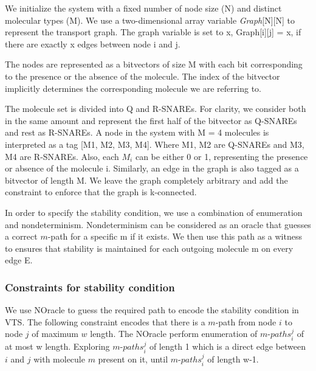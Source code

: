 We initialize the system with a fixed number of node size (N) and distinct molecular types (M). 
%
We use a two-dimensional array variable \textit{Graph}[N][N] to represent the transport graph. The graph variable is set to x, Graph[i][j] = x, if there are exactly x edges between node i and j. 

%
The nodes are represented as a bitvectors of size M with each bit corresponding to the presence or the absence of the molecule. 
%
The index of the bitvector implicitly determines the corresponding molecule we are referring to.
% 

The molecule set is divided into Q and R-SNAREs. 
%
For clarity, we consider both in the same amount and represent the first half of the bitvector as  Q-SNAREs and rest as R-SNAREs.
%
A node in the system with M = 4 molecules is interpreted as a tag [M1, M2, M3, M4]. 
%
Where M1, M2 are Q-SNAREs and M3, M4 are R-SNAREs.
%
Also, each $M_i$ can be either 0 or 1, representing the presence or absence of the molecule i.
%
Similarly, an edge in the graph is also tagged as a bitvector of length M.   
%
We leave the graph completely arbitrary and add the constraint to enforce that the graph is k-connected. 

In order to specify the stability condition, we use a combination of enumeration and nondeterminism.
%
Nondeterminism can be considered as an oracle that guesses a correct $m$-path for a specific m if it exists. 
%
We then use this path as a witness to ensures that stability is maintained for each outgoing molecule m on every edge E.


\subsubsection{Constraints for stability condition}
%
We use NOracle to guess the required path to encode the stability condition in VTS.
%
The following constraint encodes that there is a $m$-path from node $i$ to node $j$ of maximum $w$ length.
%
%
The NOracle perform enumeration of $m$-${paths}_i^j$ of at most w length. 
%
Exploring $m$-${paths}_i^j$ of length 1 which is a direct edge between $i$ and $j$ with molecule $m$ present on it, until $m$-${paths}_i^j$ of length w-1.


